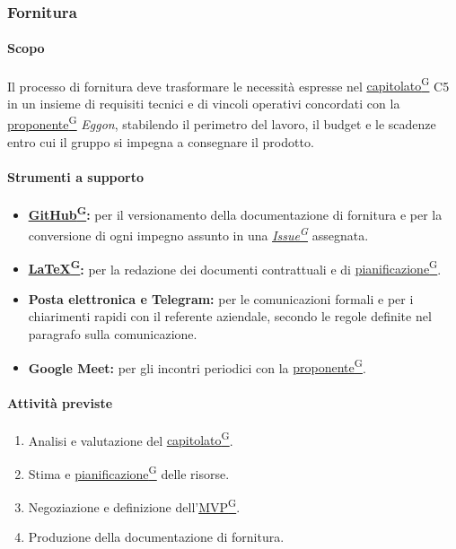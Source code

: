 \documentclass[a4paper,12pt]{article}
\providecommand{\glslink}[2]{\href{https://alittlebyte-19.github.io/Documentazione/glossario.html\#gls-#1}{\underline{#2}\textsuperscript{\scriptsize G}}}
\begin{document}
\subsubsection{Fornitura}

\paragraph{Scopo}
Il processo di fornitura deve trasformare le necessità espresse nel \glslink{capitolato}{capitolato} C5 in un insieme di requisiti tecnici e di vincoli operativi concordati con la \glslink{committente-proponente}{proponente} \textit{Eggon}, stabilendo il perimetro del lavoro, il budget e le scadenze entro cui il gruppo si impegna a consegnare il prodotto.

\paragraph{Strumenti a supporto}
\begin{itemize}
    \item \textbf{\glslink{github}{GitHub}:} per il versionamento della documentazione di fornitura e per la conversione di ogni impegno assunto in una \textit{\glslink{issue}{Issue}} assegnata.
    \item \textbf{\glslink{latex}{LaTeX}:} per la redazione dei documenti contrattuali e di \glslink{pianificazione}{pianificazione}.
    \item \textbf{Posta elettronica e Telegram:} per le comunicazioni formali e per i chiarimenti rapidi con il referente aziendale, secondo le regole definite nel paragrafo sulla comunicazione.
    \item \textbf{Google Meet:} per gli incontri periodici con la \glslink{committente-proponente}{proponente}.
\end{itemize}

\paragraph{Attività previste}
\begin{enumerate}
    \item Analisi e valutazione del \glslink{capitolato}{capitolato}.
    \item Stima e \glslink{pianificazione}{pianificazione} delle risorse.
    \item Negoziazione e definizione dell'\glslink{mvp-minimum-viable-product}{MVP}.
    \item Produzione della documentazione di fornitura.
\end{enumerate}
\end{document}

